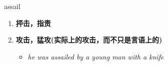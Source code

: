 
\begin{frame}
{\huge assail}
\begin{center}
\begin{enumerate}\Large
  \item \textbf{抨击，指责}
  \item \textbf{攻击，猛攻(实际上的攻击，而不只是言语上的)}
  \begin{itemize}
    \item \em{\Large{he was assailed by a young man with a knife}}
  \end{itemize}
\end{enumerate}
\end{center}
\end{frame}

